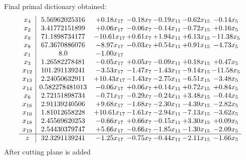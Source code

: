 \documentclass[8pt]{article}
\begin{document}
 Final primal dictionary obtained: 
\[\begin{array}{c| c c@{\hskip 2pt} c@{\hskip 2pt} c@{\hskip 2pt} c@{\hskip 2pt} c@{\hskip 2pt} }
 x_{4}   &  5.56962025316 & +  0.18 x_{17} & -0.18 x_{7} & -0.19 x_{11} & -0.62 x_{15} & -0.14 x_{5}\\
 x_{2}   &  3.41772151899 & +  0.06 x_{17} & -0.06 x_{7} & -0.14 x_{11} & -0.72 x_{15} & +  0.16 x_{5}\\
 x_{8}   &  71.1898734177 & -10.61 x_{17} & +  0.61 x_{7} & +  1.94 x_{11} & +  6.13 x_{15} & -11.38 x_{5}\\
 x_{9}   &  67.3670886076 & -8.97 x_{17} & -0.03 x_{7} & +  0.54 x_{11} & +  0.91 x_{15} & -4.73 x_{5}\\
 x_{1}   &  8.0 & -1.00 x_{17} &    &    &    &   \\
 x_{3}   &  1.26582278481 & -0.05 x_{17} & +  0.05 x_{7} & -0.09 x_{11} & +  0.18 x_{15} & +  0.47 x_{5}\\
 x_{12}   &  101.291139241 & -3.53 x_{17} & -1.47 x_{7} & -1.43 x_{11} & -9.14 x_{15} & -11.58 x_{5}\\
 x_{13}   &  2.24050632911 & + 10.43 x_{17} & -1.43 x_{7} & -2.75 x_{11} & -6.51 x_{15} & -3.48 x_{5}\\
 x_{14}   &  0.582278481013 & -0.06 x_{17} & +  0.06 x_{7} & +  0.14 x_{11} & +  0.72 x_{15} & +  0.84 x_{5}\\
 x_{6}   &  2.72151898734 & -0.71 x_{17} & -0.29 x_{7} & -0.24 x_{11} & +  3.48 x_{15} & -0.44 x_{5}\\
 x_{16}   &  2.91139240506 & +  9.68 x_{17} & -1.68 x_{7} & -2.30 x_{11} & -4.39 x_{15} & -2.82 x_{5}\\
 x_{10}   &  1.81012658228 & + 10.61 x_{17} & -1.61 x_{7} & -2.94 x_{11} & -7.13 x_{15} & -3.62 x_{5}\\
 x_{18}   &  2.45569620253 & -0.66 x_{17} & +  0.66 x_{7} & -0.15 x_{11} & +  3.30 x_{15} & +  0.09 x_{5}\\
 x_{19}   &  2.54430379747 & +  5.66 x_{17} & -0.66 x_{7} & -1.85 x_{11} & -1.30 x_{15} & -2.09 x_{5}\\
\hline
z    &  32.3291139241 & -1.25 x_{17} & -0.75 x_{7} & -0.44 x_{11} & -2.11 x_{15} & -1.66 x_{5}\\
\end{array}\]
 After cutting plane is added 
\end{document}
